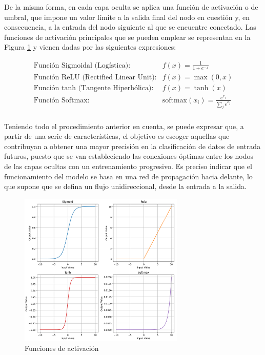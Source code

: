 \vspace{3mm}

De la misma forma, en cada capa oculta se aplica una función de activación o de umbral, que impone un valor límite a la salida final del nodo en cuestión y, en consecuencia, a la entrada del nodo siguiente al que se encuentre conectado. Las funciones de activación principales que se pueden emplear se representan en la Figura \ref{fig:functions} y vienen dadas por las siguientes expresiones: \cite{factiv} \cite{functions}

\[\begin{array}{ll}
    \text{Función Sigmoidal (Logística):} & f(x) = \frac{1}{1 + e^{-x}}\\
    \text{Función ReLU (Rectified Linear Unit):} & f(x) = \max(0, x)\\
    \text{Función tanh (Tangente Hiperbólica):} & f(x) = \tanh(x)\\
    \text{Función Softmax:} & \text{softmax}(x_i) = \frac{e^{x_i}}{\sum_{j}^{ } e^{x_j}}\\
\end{array}\]

Teniendo todo el procedimiento anterior en cuenta, se puede expresar que, a partir de una serie de características, el objetivo es escoger aquellas que contribuyan a obtener una mayor precisión en la clasificación de datos de entrada futuros, puesto que se van estableciendo las conexiones óptimas entre los nodos de las capas ocultas con un entrenamiento progresivo. Es preciso indicar que el funcionamiento del modelo se basa en una red de propagación hacia delante, lo que supone que se defina un flujo unidireccional, desde la entrada a la salida. 

\vspace{3mm}

\begin{figure}[h!]
    \centering
    \includegraphics[width=0.7\textwidth]{img/teoria/functions.png}
    \caption{Funciones de activación \cite{functions}}
    \label{fig:functions}
\end{figure}


